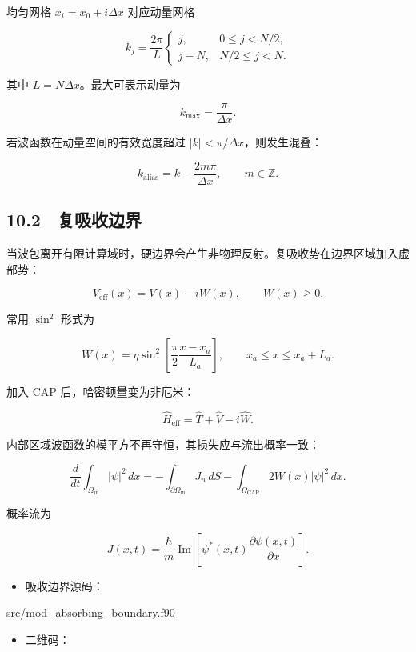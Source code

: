 \documentclass[
  a4paper,
]{ctexbook}
\providecommand{\tightlist}{%
  \setlength{\itemsep}{0pt}\setlength{\parskip}{0pt}}
\begin{document}
均匀网格 \(x_i=x_0+i\Delta x\) 对应动量网格

\[
k_j
=
\frac{2\pi}{L}
\begin{cases}
j, & 0\le j<N/2,\\
j-N, & N/2\le j<N.
\end{cases}
\]

其中 \(L=N\Delta x\)。最大可表示动量为

\[
k_{\max}=\frac{\pi}{\Delta x}.
\]

若波函数在动量空间的有效宽度超过 \(|k|<\pi/\Delta x\)，则发生混叠：

\[
k_{\mathrm{alias}}=k-\frac{2m\pi}{\Delta x},
\qquad
m\in\mathbb{Z}.
\]

\hypertarget{ux590dux5438ux6536ux8fb9ux754c}{%
\subsection{10.2　复吸收边界}\label{ux590dux5438ux6536ux8fb9ux754c}}

当波包离开有限计算域时，硬边界会产生非物理反射。复吸收势在边界区域加入虚部势：

\[
V_{\mathrm{eff}}(x)=V(x)-iW(x),
\qquad
W(x)\ge0.
\]

常用 \(\sin^2\) 形式为

\[
W(x)
=
\eta
\sin^2
\left[
\frac{\pi}{2}
\frac{x-x_a}{L_a}
\right],
\qquad
x_a\le x\le x_a+L_a.
\]

加入 CAP 后，哈密顿量变为非厄米：

\[
\hat H_{\mathrm{eff}}=\hat T+\hat V-i\hat W.
\]

内部区域波函数的模平方不再守恒，其损失应与流出概率一致：

\[
\frac{d}{dt}
\int_{\Omega_{\mathrm{in}}}|\psi|^2\,dx
=
-
\int_{\partial\Omega_{\mathrm{in}}}J_n\,dS
-
\int_{\Omega_{\mathrm{CAP}}}2W(x)|\psi|^2\,dx.
\]

概率流为

\[
J(x,t)
=
\frac{\hbar}{m}
\operatorname{Im}
\left[
\psi^{*}(x,t)
\frac{\partial\psi(x,t)}{\partial x}
\right].
\]

\begin{itemize}
\tightlist
\item
  吸收边界源码：
\end{itemize}

\href{https://github.com/l1Ha/QuantumGeneralModule/blob/main/src/mod_absorbing_boundary.f90}{src/mod\_absorbing\_boundary.f90}

\begin{itemize}
\tightlist
\item
  二维码：
\end{itemize}
\end{document}
